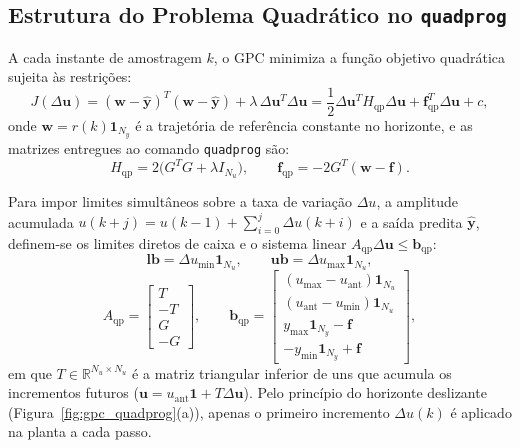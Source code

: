\documentclass[12pt,a4paper]{article}
\begin{document}
\subsection{Estrutura do Problema Quadr\'atico no \texttt{quadprog}}
A cada instante de amostragem $k$, o GPC minimiza a fun\c{c}\~ao objetivo quadr\'atica sujeita \`as restri\c{c}\~oes:
\begin{equation}
    J(\Delta \mathbf{u}) = (\mathbf{w} - \hat{\mathbf{y}})^T (\mathbf{w} - \hat{\mathbf{y}}) + \lambda\, \Delta \mathbf{u}^T \Delta \mathbf{u} = \frac{1}{2} \Delta \mathbf{u}^T H_{\text{qp}} \Delta \mathbf{u} + \mathbf{f}_{\text{qp}}^T \Delta \mathbf{u} + c,
\end{equation}
onde $\mathbf{w} = r(k)\mathbf{1}_{N_y}$ \'e a trajetória de refer\^encia constante no horizonte, e as matrizes entregues ao comando \texttt{quadprog} s\~ao:
\begin{equation}
    H_{\text{qp}} = 2\big(G^T G + \lambda I_{N_u}\big), \qquad \mathbf{f}_{\text{qp}} = -2 G^T (\mathbf{w} - \mathbf{f}).
\end{equation}

Para impor limites simult\^aneos sobre a taxa de varia\c{c}\~ao $\Delta u$, a amplitude acumulada $u(k+j) = u(k-1) + \sum_{i=0}^{j}\Delta u(k+i)$ e a sa\'ida predita $\hat{\mathbf{y}}$, definem-se os limites diretos de caixa e o sistema linear $A_{\text{qp}} \Delta \mathbf{u} \leq \mathbf{b}_{\text{qp}}$:
\begin{equation}
    \mathbf{lb} = \Delta u_{\min} \mathbf{1}_{N_u}, \qquad \mathbf{ub} = \Delta u_{\max} \mathbf{1}_{N_u},
\end{equation}
\begin{equation}
    A_{\text{qp}} =
    \begin{bmatrix}
        T \\ -T \\ G \\ -G
    \end{bmatrix},
    \qquad
    \mathbf{b}_{\text{qp}} =
    \begin{bmatrix}
        (u_{\max} - u_{\text{ant}})\mathbf{1}_{N_u} \\
        (u_{\text{ant}} - u_{\min})\mathbf{1}_{N_u} \\
        y_{\max}\mathbf{1}_{N_y} - \mathbf{f} \\
        -y_{\min}\mathbf{1}_{N_y} + \mathbf{f}
    \end{bmatrix},
\end{equation}
em que $T \in \mathbb{R}^{N_u \times N_u}$ \'e a matriz triangular inferior de uns que acumula os incrementos futuros ($\mathbf{u} = u_{\text{ant}}\mathbf{1} + T \Delta \mathbf{u}$). Pelo princ\'ipio do horizonte deslizante (Figura~\ref{fig:gpc_quadprog}(a)), apenas o primeiro incremento $\Delta u(k)$ \'e aplicado na planta a cada passo.
\end{document}
